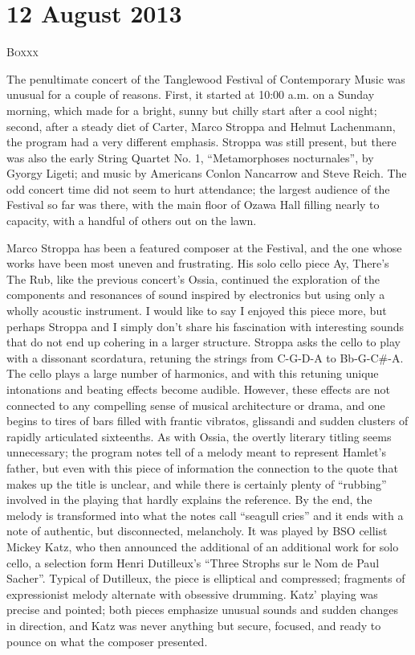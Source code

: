 \chapter{12 August 2013}

\textsc{Boxxx}

The penultimate concert of the Tanglewood Festival of Contemporary Music was unusual for a couple of reasons. First, it started at 10:00 a.m. on a Sunday morning, which made for a bright, sunny but chilly start after a cool night; second, after a steady diet of Carter, Marco Stroppa and Helmut Lachenmann, the program had a very different emphasis. Stroppa was still present, but there was also the early String Quartet No. 1, “Metamorphoses nocturnales”, by Gyorgy Ligeti; and music by Americans Conlon Nancarrow and Steve Reich. The odd concert time did not seem to hurt attendance; the largest audience of the Festival so far was there, with the main floor of Ozawa Hall filling nearly to capacity, with a handful of others out on the lawn.

Marco Stroppa has been a featured composer at the Festival, and the one whose works have been most uneven and frustrating. His solo cello piece Ay, There’s The Rub, like the previous concert’s Ossia, continued the exploration of the components and resonances of sound inspired by electronics but using only a wholly acoustic instrument. I would like to say I enjoyed this piece more, but perhaps Stroppa and I simply don’t share his fascination with interesting sounds that do not end up cohering in a larger structure. Stroppa asks the cello to play with a dissonant scordatura, retuning the strings from C-G-D-A to Bb-G-C\#-A. The cello plays a large number of harmonics, and with this retuning unique intonations and beating effects become audible. However, these effects are not connected to any compelling sense of musical architecture or drama, and one begins to tires of bars filled with frantic vibratos, glissandi and sudden clusters of rapidly articulated sixteenths. As with Ossia, the overtly literary titling seems unnecessary; the program notes tell of a melody meant to represent Hamlet’s father, but even with this piece of information the connection to the quote that makes up the title is unclear, and while there is certainly plenty of “rubbing” involved in the playing that hardly explains the reference. By the end, the melody is transformed into what the notes call “seagull cries” and it ends with a note of authentic, but disconnected, melancholy. It was played by BSO cellist Mickey Katz, who then announced the additional of an additional work for solo cello, a selection form Henri Dutilleux’s “Three Strophs sur le Nom de Paul Sacher”. Typical of Dutilleux, the piece is elliptical and compressed; fragments of expressionist melody alternate with obsessive drumming. Katz’ playing was precise and pointed; both pieces emphasize unusual sounds and sudden changes in direction, and Katz was never anything but secure, focused, and ready to pounce on what the composer presented.

